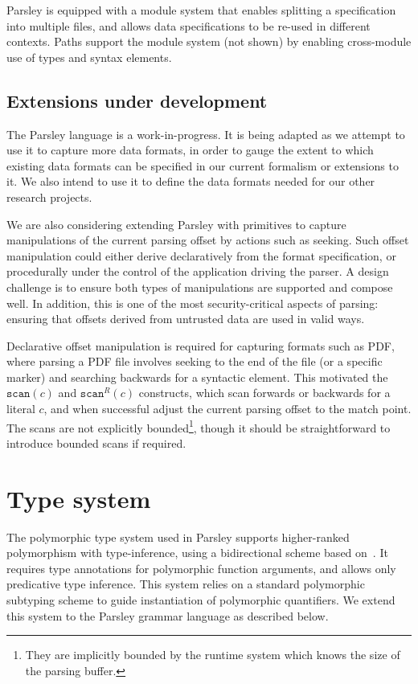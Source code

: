 \documentclass[letterpaper]{article}
\begin{document}
Parsley is equipped with a module system that enables splitting a
specification into multiple files, and allows data specifications to
be re-used in different contexts.  Paths support the module system
(not shown) by enabling cross-module use of types and syntax elements.

\subsection*{Extensions under development}

The Parsley language is a work-in-progress.  It is being adapted as we
attempt to use it to capture more data formats, in order to gauge the
extent to which existing data formats can be specified in our current
formalism or extensions to it.  We also intend to use it to define the
data formats needed for our other research projects.

We are also considering extending Parsley with primitives to capture
manipulations of the current parsing offset by actions such as
seeking.  Such offset manipulation could either derive declaratively
from the format specification, or procedurally under the control of
the application driving the parser.  A design challenge is to ensure
both types of manipulations are supported and compose well.  In
addition, this is one of the most security-critical aspects of
parsing: ensuring that offsets derived from untrusted data are used in
valid ways.

Declarative offset manipulation is required for capturing formats such
as PDF, where parsing a PDF file involves seeking to the end of the
file (or a specific marker) and searching backwards for a syntactic
element.  This motivated the $\texttt{scan}(c)$ and
$\texttt{scan}^R(c)$ constructs, which scan forwards or backwards for
a literal $c$, and when successful adjust the current parsing offset
to the match point.  The scans are not explicitly
bounded\footnote{They are implicitly bounded by the runtime system
  which knows the size of the parsing buffer.}, though it should be
straightforward to introduce bounded scans if required.

\section{Type system}
\label{s:typesys}

The polymorphic type system used in Parsley supports higher-ranked
polymorphism with type-inference, using a bidirectional scheme based
on~\cite{Dunfield13:bidir}.  It requires type annotations for
polymorphic function arguments, and allows only predicative type
inference.  This system relies on a standard polymorphic subtyping
scheme \cite{odersky96} to guide instantiation of polymorphic
quantifiers.  We extend this system to the Parsley grammar language as
described below.
\end{document}
